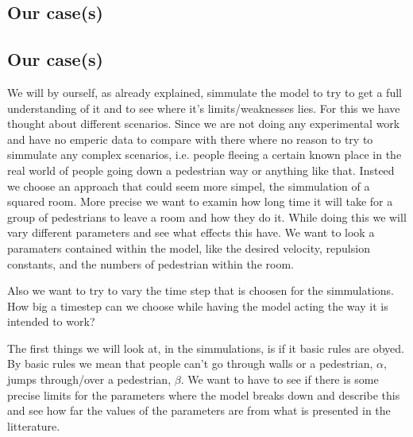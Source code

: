 \subsection{Our case(s)}


\subsection{Our case(s)}
We will by ourself, as already explained, simmulate the model to try to get a full understanding of it and to see where it's limits/weaknesses lies. For this we have thought about different scenarios. Since we are not doing any experimental work and have no emperic data to compare with there where no reason to try to simmulate any complex scenarios, i.e. people fleeing a certain known place in the real world of people going down a pedestrian way or anything like that. Insteed we choose an approach that could seem more simpel, the simmulation of a squared room. More precise we want to examin how long time it will take for a group of pedestrians to leave a room and how they do it. While doing this we will vary different parameters and see what effects this have. We want to look a paramaters contained within the model, like the desired velocity, repulsion constants, and the numbers of pedestrian within the room. 

Also we want to try to vary the time step that is choosen for the simmulations. How big a timestep can we choose while having the model acting the way it is intended to work?

The first things we will look at, in the simmulations, is if it basic rules are obyed. By basic rules we mean that people can't go through walls    or a pedestrian, $\alpha$, jumps through/over a pedestrian, $\beta$. We want to have to see if there is some precise limits for the parameters where the model breaks down and describe this and see how far the values of the parameters are from what is presented in the litterature.   


